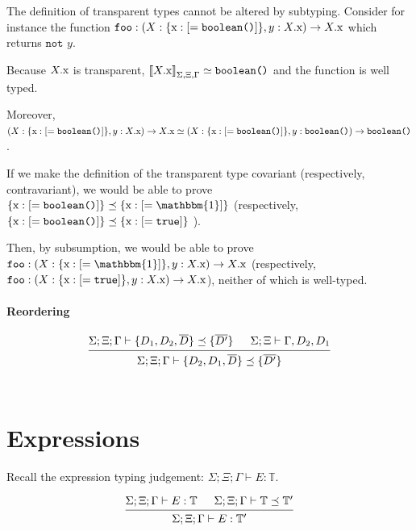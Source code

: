 \documentclass[12pt]{article}
\newcommand{\tx}{\text{\rm x}}
\newcommand{\Gammatop}{\ensuremath{\Xi}}
\newcommand{\Gammabot}{\ensuremath{\Gamma}}
\newcommand{\toptype}{\mathbbm{1}}
\begin{document}
The definition of transparent types cannot be altered by subtyping.
Consider for instance the function
$\texttt{foo} : (X : \{ \tx : [= \texttt{boolean()}] \}, y : X.\tx) \rightarrow X.\tx$ which
returns $\texttt{not } y$.

Because $X.\tx$ is transparent, $\interp{X.\tx} \simeq \texttt{boolean()}$ and the function is well typed.

Moreover,
$(X : \{ \tx : [= \texttt{boolean()}] \}, y : X.\tx) \rightarrow X.\tx \simeq (X : \{ \tx : [= \texttt{boolean()}] \}, y : \texttt{boolean()}) \rightarrow \texttt{boolean()}$.

If we make the definition of the transparent type covariant (respectively, contravariant),
we would be able to prove $\{ \tx : [= \texttt{boolean()}] \} \preceq \{ \tx : [= \toptype] \}$
(respectively, $\{ \tx : [= \texttt{boolean()}] \} \preceq \{ \tx : [= \texttt{true}] \}$ ).

Then, by subsumption, we would be able to prove
$\texttt{foo} : (X : \{ \tx : [= \toptype] \}, y : X.\tx) \rightarrow X.\tx$
(respectively, $\texttt{foo} : (X : \{ \tx : [= \texttt{true}] \}, y : X.\tx) \rightarrow X.\tx$),
neither of which is well-typed.

\paragraph{Reordering}

\[
    \begin{prooftree}
        \hypo{ \Sigma; \Gammatop; \Gammabot \vdash \{ D_1, D_2, \overline{D} \} \preceq \{ \overline{D'} \} }
        \hypo{ \Sigma; \Gammatop \vdash \Gammabot, D_2, D_1 }
        \infer2{ \Sigma; \Gammatop; \Gammabot \vdash \{ D_2, D_1, \overline{D} \} \preceq \{ \overline{D'} \} }
    \end{prooftree}
\] \\

\section{Expressions}

Recall the expression typing judgement: $\Sigma; \Gammatop; \Gammabot \vdash E : \mathbb{T}$.

\[
    \begin{prooftree}
        \hypo{ \Sigma; \Gammatop; \Gammabot \vdash E : \mathbb{T}}
        \hypo{ \Sigma; \Gammatop; \Gammabot \vdash \mathbb{T} \preceq \mathbb{T}' }
        \infer2{ \Sigma; \Gammatop; \Gammabot \vdash E: \mathbb{T}' }
    \end{prooftree}
\] \\
\end{document}
